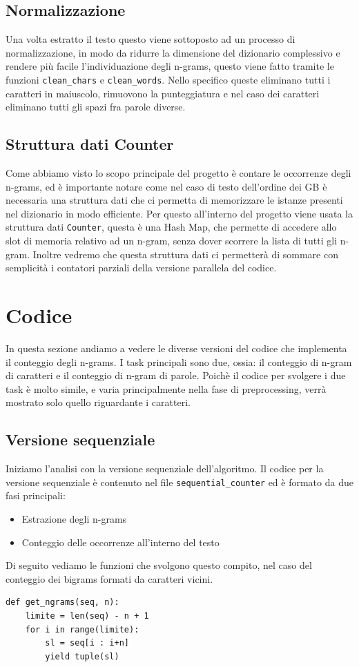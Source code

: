 \documentclass[10pt,twocolumn,letterpaper]{article}
\begin{document}
\subsection{Normalizzazione}
Una volta estratto il testo questo viene sottoposto ad un processo di normalizzazione, in modo da ridurre la dimensione del dizionario complessivo e rendere più facile l'individuazione degli n-grams, questo viene fatto tramite le funzioni \lstinline{clean_chars} e \lstinline{clean_words}.
Nello specifico queste eliminano tutti i caratteri in maiuscolo, rimuovono la punteggiatura e nel caso dei caratteri eliminano tutti gli spazi fra parole diverse.

\subsection{Struttura dati Counter}
Come abbiamo visto lo scopo principale del progetto è contare le occorrenze degli n-grams, ed è importante notare come nel caso di testo dell'ordine dei GB è necessaria una struttura dati che ci permetta di memorizzare le istanze presenti nel dizionario in modo efficiente. Per questo all'interno del progetto viene usata la struttura dati \lstinline{Counter}, questa è una Hash Map, che permette di accedere allo slot di memoria relativo ad un n-gram, senza dover scorrere la lista di tutti gli n-gram. Inoltre vedremo che questa struttura dati ci permetterà di sommare con semplicità i contatori parziali della versione parallela del codice.

\section{Codice}
In questa sezione andiamo a vedere le diverse versioni del codice che implementa il conteggio degli n-grams. I task principali sono due, ossia: il conteggio di n-gram di caratteri e il conteggio di n-gram di parole. Poichè il codice per svolgere i due task è molto simile, e varia principalmente nella fase di preprocessing, verrà mostrato solo quello riguardante i caratteri.

\subsection{Versione sequenziale}
Iniziamo l'analisi con la versione sequenziale dell'algoritmo.
Il codice per la versione sequenziale è contenuto nel file \lstinline{sequential_counter} ed è formato da due fasi principali:
\begin{itemize}
   \item Estrazione degli n-grams
   \item Conteggio delle occorrenze all'interno del testo
\end{itemize}
Di seguito vediamo le funzioni che svolgono questo compito, nel caso del conteggio dei bigrams formati da caratteri vicini.
\begin{lstlisting}[caption={Estrazione degli n-grams sequenziale.}]
def get_ngrams(seq, n):
    limite = len(seq) - n + 1
    for i in range(limite):
        sl = seq[i : i+n]
        yield tuple(sl)
\end{lstlisting}
\end{document}
